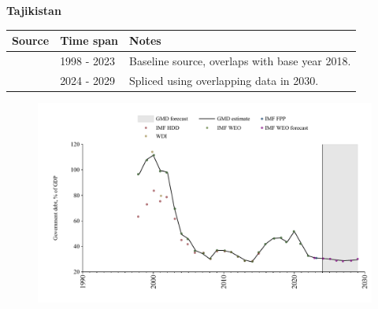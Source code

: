 \documentclass[12pt,a4paper,landscape]{article}
\begin{document}
\begin{adjustbox}{max totalsize={\paperwidth}{\paperheight},center}
\begin{minipage}[t][\textheight][t]{\textwidth}
\vspace*{0.5cm}
{}
\begin{center}
{\Large\bfseries Tajikistan}
\end{center}
\vspace{0.5cm}
\begin{table}[H]
\centering
\small
\begin{tabular}{|l|l|l|}
\hline
\textbf{Source} & \textbf{Time span} & \textbf{Notes} \\
\hline
\rowcolor{white}\cite{IMF_FPP}& 1998 - 2023 &Baseline source, overlaps with base year 2018.\\
\rowcolor{lightgray}\cite{IMF_WEO_forecast}& 2024 - 2029 &Spliced using overlapping data in 2030.\\
\hline
\end{tabular}
\end{table}
\begin{figure}[H]
\centering
\includegraphics[width=\textwidth,height=0.6\textheight,keepaspectratio]{graphs/TJK_govdebt_GDP.pdf}
\end{figure}
\end{minipage}
\end{adjustbox}
\end{document}
